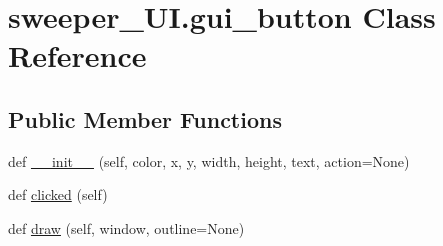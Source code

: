 \hypertarget{classsweeper___u_i_1_1gui__button}{}\section{sweeper\+\_\+\+U\+I.\+gui\+\_\+button Class Reference}
\label{classsweeper___u_i_1_1gui__button}
\subsection*{Public Member Functions}
\begin{DoxyCompactItemize}
\item 
def \hyperlink{classsweeper___u_i_1_1gui__button_a0d9c0c788a776c9d8663a285852fe998}{\+\_\+\+\_\+init\+\_\+\+\_\+} (self, color, x, y, width, height, text, action=None)
\item 
def \hyperlink{classsweeper___u_i_1_1gui__button_af74950231e0ddbcb8582404a8320dee5}{clicked} (self)
\item 
def \hyperlink{classsweeper___u_i_1_1gui__button_ae168198450518f00782017759a8879bd}{draw} (self, window, outline=None)
\end{DoxyCompactItemize}
